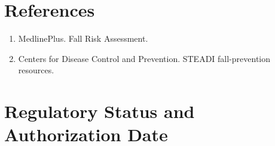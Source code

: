 \section*{References} \begin{enumerate}\item MedlinePlus. Fall Risk Assessment.\item Centers for Disease Control and Prevention. STEADI fall-prevention resources.\end{enumerate}
\clearpage\section*{Regulatory Status and Authorization Date}\clearpage
